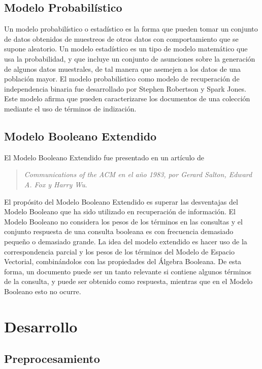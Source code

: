 \documentclass{llncs}
\begin{document}
	\subsection{Modelo Probabil\'istico}
	Un modelo probabil\'istico o estad\'istico es la forma que pueden tomar un conjunto de datos obtenidos de muestreos de otros datos con comportamiento que se supone aleatorio. Un modelo estadístico es un tipo de modelo matemático que usa la probabilidad, y que incluye un conjunto de asunciones sobre la generación de algunos datos muestrales, de tal manera que asemejen a los datos de una población mayor. El modelo probabilístico como modelo de recuperación de independencia binaria fue desarrollado por Stephen Robertson y Spark Jones. Este modelo afirma que pueden caracterizarse los documentos de una colección mediante el uso de términos de indización.\\

	\subsection{Modelo Booleano Extendido}
	El Modelo Booleano Extendido fue presentado en un art\'iculo de 
	\begin{quotation}
		\textit{Communications of the ACM en el año 1983, por Gerard Salton, Edward A. Fox y Harry Wu}. 
	\end{quotation}
	El propósito del Modelo Booleano Extendido es superar las desventajas del Modelo Booleano que ha sido utilizado en recuperación de información. 
	El Modelo Booleano no considera los pesos de los términos en las consultas y el conjunto respuesta de una consulta booleana 
	es con frecuencia demasiado pequeño o demasiado grande. 
	La idea del modelo extendido es hacer uso de la correspondencia parcial y los pesos de los términos del Modelo de Espacio Vectorial, 
	combinándolos con las propiedades del Álgebra Booleana. De esta forma, un documento puede ser un tanto relevante 
	si contiene algunos términos de la consulta, y puede ser obtenido como respuesta, mientras que en el Modelo Booleano esto no ocurre.

	\section{Desarrollo}

	\subsection{Preprocesamiento}
	
\end{document}
